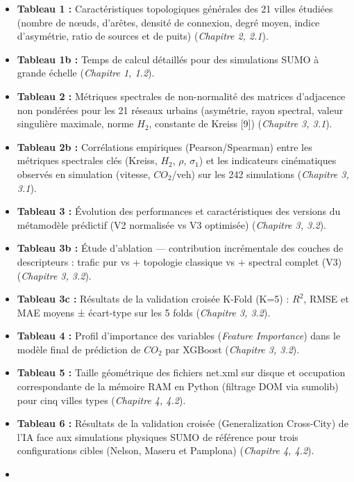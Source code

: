 \documentclass[10pt, a4paper]{article}
\providecommand{\tightlist}{}
\begin{document}
\begin{itemize}
\tightlist
\item
  \textbf{Tableau 1 :} Caractéristiques topologiques générales des 21
  villes étudiées (nombre de nœuds, d'arêtes, densité de connexion,
  degré moyen, indice d'asymétrie, ratio de sources et de puits)
  (\emph{Chapitre 2, 2.1}).
\item
  \textbf{Tableau 1b :} Temps de calcul détaillés pour des simulations
  SUMO à grande échelle (\emph{Chapitre 1, 1.2}).
\item
  \textbf{Tableau 2 :} Métriques spectrales de non-normalité des
  matrices d'adjacence non pondérées pour les 21 réseaux urbains
  (asymétrie, rayon spectral, valeur singulière maximale, norme \(H_2\),
  constante de Kreiss {[}9{]}) (\emph{Chapitre 3, 3.1}).
\item
  \textbf{Tableau 2b :} Corrélations empiriques (Pearson/Spearman) entre
  les métriques spectrales clés (Kreiss, \(H_2\), \(\rho\),
  \(\sigma_1\)) et les indicateurs cinématiques observés en simulation
  (vitesse, \(CO_2\)/veh) sur les 242 simulations (\emph{Chapitre 3,
  3.1}).
\item
  \textbf{Tableau 3 :} Évolution des performances et caractéristiques
  des versions du métamodèle prédictif (V2 normalisée vs V3 optimisée)
  (\emph{Chapitre 3, 3.2}).
\item
  \textbf{Tableau 3b :} Étude d'ablation --- contribution incrémentale
  des couches de descripteurs : trafic pur vs + topologie classique vs +
  spectral complet (V3) (\emph{Chapitre 3, 3.2}).
\item
  \textbf{Tableau 3c :} Résultats de la validation croisée K-Fold (K=5)
  : \(R^2\), RMSE et MAE moyens ± écart-type sur les 5 folds
  (\emph{Chapitre 3, 3.2}).
\item
  \textbf{Tableau 4 :} Profil d'importance des variables (\emph{Feature
  Importance}) dans le modèle final de prédiction de \(CO_2\) par
  XGBoost (\emph{Chapitre 3, 3.2}).
\item
  \textbf{Tableau 5 :} Taille géométrique des fichiers net.xml sur
  disque et occupation correspondante de la mémoire RAM en Python
  (filtrage DOM via sumolib) pour cinq villes types (\emph{Chapitre 4,
  4.2}).
\item
  \textbf{Tableau 6 :} Résultats de la validation croisée
  (Generalization Cross-City) de l'IA face aux simulations physiques
  SUMO de référence pour trois configurations cibles (Nelson, Maseru et
  Pamplona) (\emph{Chapitre 4, 4.2}).
\item

\end{itemize}
\end{document}
